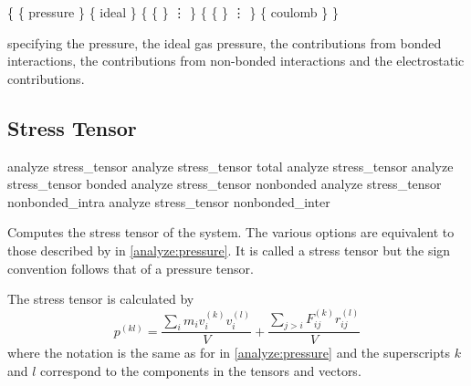
\begin{code}
\{ \{ pressure  \}
   \{ ideal  \} 
   \{ \{   \}
      \vdots
   \}
   \{ \{   \}
      \vdots
   \}
   \{ coulomb  \}
\}
\end{code}
specifying the pressure, the ideal gas pressure, the
contributions from bonded interactions, the contributions from
non-bonded interactions and the electrostatic contributions.


\subsection{Stress Tensor}
\label{analyze:stresstensor}
\begin{pysyntax}
\end{pysyntax}

\begin{essyntax}
   analyze stress_tensor
   analyze stress_tensor total
   analyze stress_tensor 
   analyze stress_tensor bonded 
   analyze stress_tensor nonbonded  
   analyze stress_tensor nonbonded_intra 
   analyze stress_tensor nonbonded_inter 
\end{essyntax}

Computes the stress tensor of the system.  The various options are equivalent to those described by
 in \vref{analyze:pressure}. It is called a stress tensor but the sign
convention follows that of a pressure tensor.


The stress tensor is calculated by 
\begin{equation}
  p^{(kl)} = \frac{\sum_{i} {m_{i}v_{i}^{(k)}v_{i}^{(l)}}}{V} + \frac{\sum_{j>i}{F_{ij}^{(k)}r_{ij}^{(l)}}}{V}
\end{equation}
where the notation is the same as for  in \vref{analyze:pressure} and the
superscripts $k$ and $l$ correspond to the components in the tensors and vectors.  

